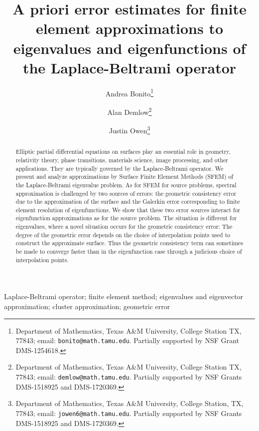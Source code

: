 \documentclass{siamart0516}
\title{A priori error estimates for finite element approximations to eigenvalues and eigenfunctions of the Laplace-Beltrami operator}
\author{
  Andrea Bonito\thanks{Department of Mathematics, Texas A\&M University, College Station TX, 77843; email: {\tt bonito@math.tamu.edu}. 
  Partially supported by NSF Grant DMS-1254618.
}
\and
Alan Demlow\thanks{Department of Mathematics, Texas A\&M University, College Station TX, 77843; email: {\tt demlow@math.tamu.edu}.
Partially supported by NSF Grants DMS-1518925 and DMS-1720369.
}
\and
Justin Owen\thanks{Department of Mathematics, Texas A\&M University, College Station, TX, 77843; email: {\tt jowen6@math.tamu.edu}.  Partially supported by NSF Grants DMS-1518925 and DMS-1720369.
}
}
\numberwithin{equation}{section}
\numberwithin{theorem}{section}
\numberwithin{figure}{section}
\begin{document}


\maketitle


\begin{abstract}
Elliptic partial differential equations on surfaces play an essential role in geometry, relativity theory, phase transitions, materials science, image processing, and other applications. They are typically governed by the Laplace-Beltrami operator. We present and analyze approximations by Surface Finite Element Methods (SFEM) of the Laplace-Beltrami eigenvalue problem.  As for SFEM for source problems, spectral approximation is challenged by two sources of errors: the geometric consistency error due to the approximation of the surface and the Galerkin error corresponding to finite element resolution of eigenfunctions. We show that these two error sources interact for eigenfunction approximations as for the source problem.  The situation is different for eigenvalues,  %
where a novel situation occurs for the geometric consistency error: The degree of the geometric error depends on the choice of interpolation points used to construct the approximate surface.   Thus the geometric consistency term can sometimes be made to converge faster than in the eigenfunction case through a judicious choice of interpolation points.    
\end{abstract}

\begin{keywords}
Laplace-Beltrami operator; finite element method; eigenvalues and eigenvector approximation; cluster approximation; geometric error
\end{keywords}
\end{document}

